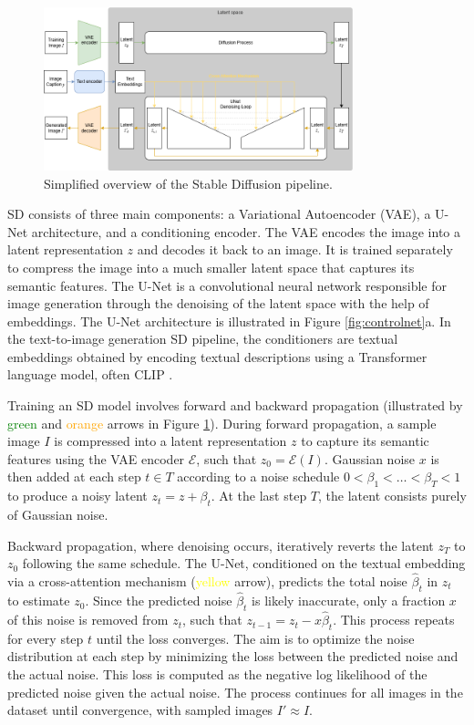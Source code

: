 \begin{figure}[ht]
    \centering
    \includegraphics[width=0.8\textwidth]{Figures/prelim_related/sd-workflow.png}
    \caption{Simplified overview of the Stable Diffusion pipeline.}
    \label{fig:stable_diffusion}
\end{figure}

SD consists of three main components: a Variational Autoencoder (VAE), a U-Net architecture, and a conditioning encoder. The VAE encodes the image into a latent representation $z$ and decodes it back to an image. It is trained separately to compress the image into a much smaller latent space that captures its semantic features. The U-Net is a convolutional neural network responsible for image generation through the denoising of the latent space with the help of embeddings. The U-Net architecture is illustrated in Figure \ref{fig:controlnet}a. In the text-to-image generation SD pipeline, the conditioners are textual embeddings obtained by encoding textual descriptions using a Transformer language model, often CLIP \citep{Radford.2021}.

Training an SD model involves forward and backward propagation (illustrated by \textcolor{green}{green} and \textcolor{orange}{orange} arrows in Figure \ref{fig:stable_diffusion}). During forward propagation, a sample image $I$ is compressed into a latent representation $z$ to capture its semantic features using the VAE encoder $\mathcal{E}$, such that $z_0 = \mathcal{E}(I)$. Gaussian noise $x$ is then added at each step $t \in T$ according to a noise schedule $0 < \beta_1 < \dots < \beta_T < 1$ to produce a noisy latent $z_t = z + \beta_t$. At the last step $T$, the latent consists purely of Gaussian noise.

Backward propagation, where denoising occurs, iteratively reverts the latent $z_T$ to $z_0$ following the same schedule. The U-Net, conditioned on the textual embedding via a cross-attention mechanism (\textcolor{yellow}{yellow} arrow), predicts the total noise $\hat{\beta}_t$ in $z_t$ to estimate $z_0$. Since the predicted noise $\hat{\beta}_t$ is likely inaccurate, only a fraction $x$ of this noise is removed from $z_t$, such that $z_{t-1} = z_t - x \hat{\beta}_t$. This process repeats for every step $t$ until the loss converges. The aim is to optimize the noise distribution at each step by minimizing the loss between the predicted noise and the actual noise. This loss is computed as the negative log likelihood of the predicted noise given the actual noise. The process continues for all images in the dataset until convergence, with sampled images $I' \approx I$.

